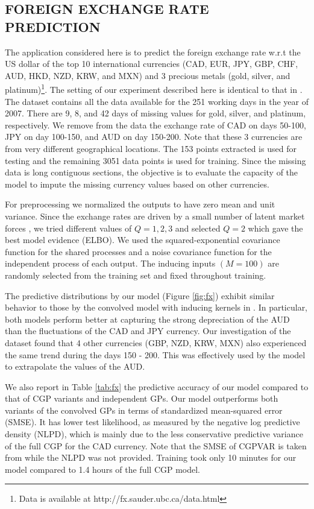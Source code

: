 \subsection{FOREIGN EXCHANGE RATE PREDICTION}
The application considered here is to predict the foreign exchange rate w.r.t the US dollar of the top 10 international currencies (CAD, EUR, JPY, GBP, CHF, AUD, HKD, NZD, KRW, and MXN) and 3 precious metals (gold, silver, and platinum)\footnote{Data is available at http://fx.sauder.ubc.ca/data.html}. 
The setting of our experiment described here is identical to that in \citet{alvarez2010efficient}.
The dataset contains all the data available for the 251 working days in the year of 2007.
There are 9, 8, and 42 days of missing values  for gold, silver, and platinum, respectively.
We remove from the data the exchange rate of CAD on days 50-100, JPY on day 100-150, and AUD on day 150-200.
Note that these 3 currencies are from very different geographical locations. 
The 153 points extracted is used for testing and the remaining 3051 data points is used for training.
Since the missing data is long contiguous sections, the objective is to evaluate the capacity of the model to impute the missing currency values based on other currencies.

For preprocessing we normalized the outputs to have zero mean and unit variance.
Since the exchange rates are driven by a small number of latent market forces \citet{alvarez2010efficient}, we tried different values of $Q = {1,2,3}$ and selected $Q = 2$ which gave the best model evidence (ELBO).
We used the squared-exponential covariance function for the shared processes and a noise covariance function for the independent process of each output.
The inducing inputs $(M = 100)$ are randomly selected from the training set and fixed throughout training.

The predictive distributions by our model (Figure \ref{fig:fx}) exhibit similar behavior to those by the convolved model with inducing kernels in \citet{alvarez2010efficient}.
In particular, both models perform better at capturing the strong depreciation of the AUD than the fluctuations of the CAD and JPY currency.
Our investigation of the dataset found that 4 other currencies (GBP, NZD, KRW, MXN) also experienced the same trend during the days 150 - 200.
This was effectively used by the model to extrapolate the values of the AUD.

We also report in Table \ref{tab:fx} the predictive accuracy of our model compared to that of CGP variants and independent GPs. 
Our model outperforms both variants of the convolved GPs in terms of standardized mean-squared error (SMSE).
It has lower test likelihood, as measured by the negative log predictive density (NLPD), which is mainly due to the less conservative predictive variance of the full CGP for the CAD currency.
Note that the SMSE of CGPVAR is taken from \citet{alvarez2010efficient} while the NLPD was not provided.
Training took only 10 minutes for our model compared to 1.4 hours of the full CGP model.


